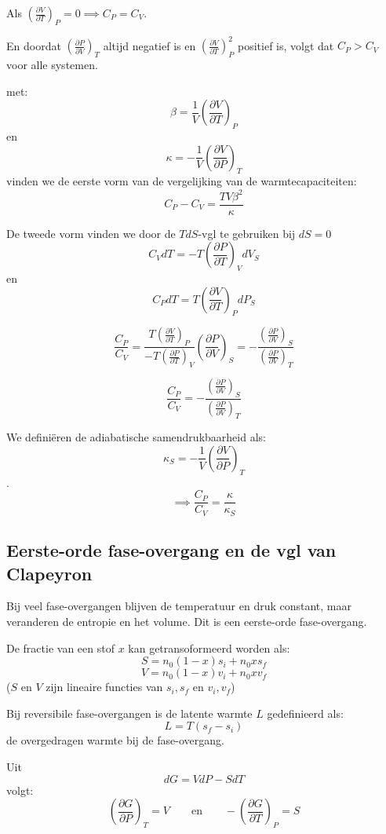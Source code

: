 Als \(\left(\frac{\partial V}{\partial T}\right)_P = 0 \implies C_P = C_V\). 

En doordat \(\left(\frac{\partial P}{\partial V}\right)_T\) altijd negatief is en \(\left(\frac{\partial V}{\partial T}\right)^2_P\) positief is, volgt dat \(C_P > C_V\) voor alle systemen.


met:
\[\beta = \frac{1}{V} \left(\frac{\partial V}{\partial T}\right)_P\]
en
\[\kappa = -\frac{1}{V} \left(\frac{\partial V}{\partial P}\right)_T\]
vinden we de eerste vorm van de vergelijking van de warmtecapaciteiten:
\[\boxed{C_P - C_V = \frac{TV\beta^2}{\kappa}}\]

De tweede vorm vinden we door de \(TdS\)-vgl te gebruiken bij \(dS = 0\)
\[C_V dT = - T\left(\frac{\partial P}{\partial T}\right)_V dV_S\]
en 
\[C_PdT = T \left(\frac{\partial V}{\partial T}\right)_P dP_S\]

\[\frac{C_P}{C_V} = \frac{T \left(\frac{\partial V}{\partial T}\right)_P}{- T\left(\frac{\partial P}{\partial T}\right)_V} \left(\frac{\partial P}{\partial V}\right)_S = -\frac{\left(\frac{\partial P}{\partial V}\right)_S}{\left(\frac{\partial P}{\partial V}\right)_T}\]

\[\boxed{\frac{C_P}{C_V} = -\frac{\left(\frac{\partial P}{\partial V}\right)_S}{\left(\frac{\partial P}{\partial V}\right)_T}}\]

We definiëren de adiabatische samendrukbaarheid als:
\[\kappa_S = -\frac{1}{V} \left(\frac{\partial V}{\partial P}\right)_T\].
\[\implies \frac{C_P}{C_V} = \frac{\kappa}{\kappa_S}\]

\subsection{Eerste-orde fase-overgang en de vgl van Clapeyron}

Bij veel fase-overgangen blijven de temperatuur en druk constant, maar veranderen de entropie en het volume. Dit is een eerste-orde fase-overgang.

De fractie van een stof \(x\) kan getransoformeerd worden als:
\[S = n_0(1-x)s_i + n_0 x s_f\]
\[V = n_0(1-x)v_i + n_0 x v_f\]
(\(S\) en \(V\) zijn lineaire functies van \(s_i, s_f\) en \(v_i, v_f\))

Bij reversibile fase-overgangen is de latente warmte \(L\) gedefinieerd als:
\[L = T(s_f - s_i)\] 
de overgedragen warmte bij de fase-overgang.

Uit 
\[dG = VdP-SdT\]
volgt:
\[\left(\frac{\partial G}{\partial P}\right)_T = V \qquad\text{en}\qquad -\left(\frac{\partial G}{\partial T}\right)_P = S\]

